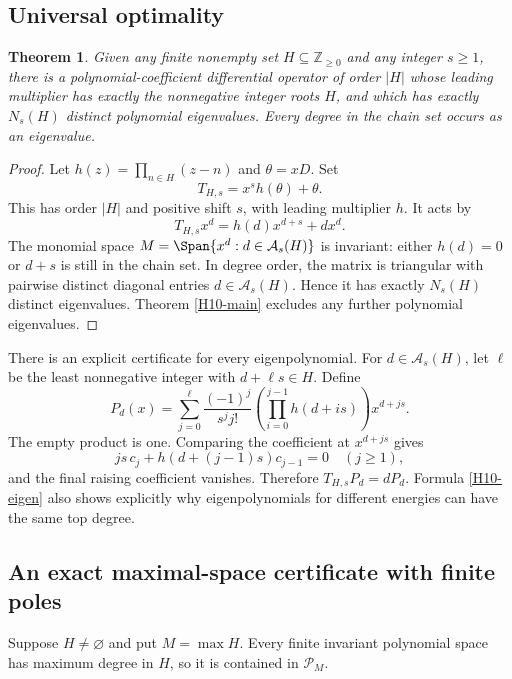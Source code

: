 \documentclass[11pt,a4paper]{article}
\newtheorem{theorem}{Theorem}[section]
\theoremstyle{definition}\newtheorem{definition}[theorem]{Definition}
\theoremstyle{remark}\newtheorem{remark}[theorem]{Remark}
\newcommand{\Pcal}{\mathcal P}\newcommand{\PP}{\mathcal P}\newcommand{\Pp}{\mathcal P}
\numberwithin{equation}{section}
\begin{document}
\subsection{Universal optimality}\label{H10-sec-3}
\begin{theorem}\label{H10-sharp}
Given any finite nonempty set $H\subseteq\mathbb Z_{\ge0}$ and any integer $s\ge1$, there is a polynomial-coefficient differential operator of order $|H|$ whose leading multiplier has exactly the nonnegative integer roots $H$, and which has exactly $N_s(H)$ distinct polynomial eigenvalues. Every degree in the chain set occurs as an eigenvalue.
\end{theorem}
\begin{proof}
Let $h(z)=\prod_{n\in H}(z-n)$ and $\theta=xD$. Set
\[T_{H,s}=x^s h(\theta)+\theta.
\]
This has order $|H|$ and positive shift $s$, with leading multiplier $h$. It acts by
\[T_{H,s}x^d=h(d)x^{d+s}+d x^d.
\]
The monomial space $M=\Span\{x^d:d\in\mathcal A_s(H)\}$ is invariant: either $h(d)=0$ or $d+s$ is still in the chain set. In degree order, the matrix is triangular with pairwise distinct diagonal entries $d\in\mathcal A_s(H)$. Hence it has exactly $N_s(H)$ distinct eigenvalues. Theorem \ref{H10-main} excludes any further polynomial eigenvalues.
\end{proof}
There is an explicit certificate for every eigenpolynomial. For $d\in\mathcal A_s(H)$, let $\ell$ be the least nonnegative integer with $d+\ell s\in H$. Define
\begin{equation}\label{H10-eigen}
P_d(x)=\sum_{j=0}^{\ell}\frac{(-1)^j}{s^j j!}
\left(\prod_{i=0}^{j-1}h(d+is)\right)x^{d+js}.
\end{equation}
The empty product is one. Comparing the coefficient at $x^{d+js}$ gives
\[js\,c_j+h(d+(j-1)s)c_{j-1}=0\quad(j\ge1),
\]
and the final raising coefficient vanishes. Therefore $T_{H,s}P_d=dP_d$. Formula \eqref{H10-eigen} also shows explicitly why eigenpolynomials for different energies can have the same top degree.
\subsection{An exact maximal-space certificate with finite poles}\label{H10-sec-4}
Suppose $H\ne\varnothing$ and put $M=\max H$. Every finite invariant polynomial space has maximum degree in $H$, so it is contained in $\Pcal_M$.
\end{document}
